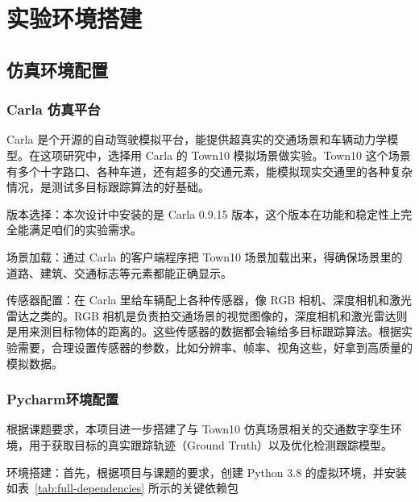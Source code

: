 \chapter{实验环境搭建}

\section{仿真环境配置}

\subsection{Carla 仿真平台}


Carla 是个开源的自动驾驶模拟平台，能提供超真实的交通场景和车辆动力学模型。在这项研究中，选择用 Carla 的 Town10 模拟场景做实验。Town10 这个场景有多个十字路口、各种车道，还有超多的交通元素，能模拟现实交通里的各种复杂情况，是测试多目标跟踪算法的好基础。

版本选择：本次设计中安装的是 Carla 0.9.15 版本，这个版本在功能和稳定性上完全能满足咱们的实验需求。

场景加载：通过 Carla 的客户端程序把 Town10 场景加载出来，得确保场景里的道路、建筑、交通标志等元素都能正确显示。

传感器配置：在 Carla 里给车辆配上各种传感器，像 RGB 相机、深度相机和激光雷达之类的。RGB 相机是负责拍交通场景的视觉图像的，深度相机和激光雷达则是用来测目标物体的距离的。这些传感器的数据都会输给多目标跟踪算法。根据实验需要，合理设置传感器的参数，比如分辨率、帧率、视角这些，好拿到高质量的模拟数据。



\subsection{Pycharm环境配置}
根据课题要求，本项目进一步搭建了与 Town10 仿真场景相关的交通数字孪生环境，用于获取目标的真实跟踪轨迹（Ground Truth）以及优化检测跟踪模型。

环境搭建：首先，根据项目与课题的要求，创建 Python 3.8 的虚拟环境，并安装如表~\ref{tab:full-dependencies} 所示的关键依赖包

